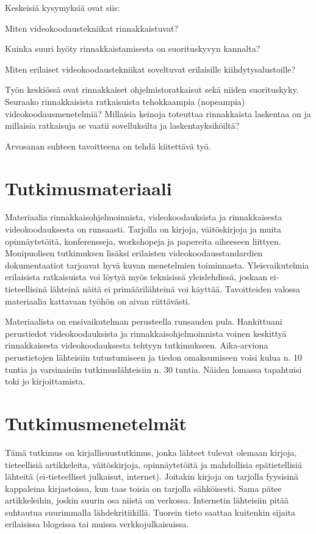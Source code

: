 \documentclass[12pt,a4paper,finnish,oneside]{article}
\begin{document}
Keskeisiä kysymyksiä ovat siis:
\begin{compactitem}
\item Miten videokoodaustekniikat rinnakkaistuvat?
\item Kuinka suuri hyöty rinnakkaistamisesta on suorituskyvyn kannalta?
\item Miten erilaiset videokoodaustekniikat soveltuvat erilaisille 
kiihdytysalustoille?
\end{compactitem}

Työn keskiössä ovat rinnakkaiset ohjelmistoratkaisut sekä niiden suorituskyky. Seuraako rinnakkaisista
ratkaisuista tehokkaampia (nopeampia) videokoodausmenetelmiä? Millaisia
keinoja toteuttaa rinnakkaista laskentaa on ja millaisia ratkaisuja se vaatii
sovelluksilta ja laskentayksiköiltä?

Arvosanan suhteen tavoitteena on tehdä kiitettävä työ.

\section{Tutkimusmateriaali}

Materiaalia rinnakkaisohjelmoinnista, videokoodauksista ja rinnakkaisesta
videokoodauksesta on runsaasti. Tarjolla on kirjoja, väitöskirjoja ja muita
opinnäytetöitä, konferensseja, workshopeja ja papereita aiheeseen liittyen.
Monipuolisen tutkimuksen lisäksi erilaisten videokoodausstandardien dokumentaatiot
tarjoavat hyvä kuvan menetelmien toiminnasta. Yleisvaikutelmia erilaisista
ratkaisuista voi löytyä myös teknisissä yleislehdissä, joskaan ei-tieteellisinä
lähteinä näitä ei primäärilähteinä voi käyttää. Tavoitteiden valossa
materiaalia kattavaan työhön on aivan riittävästi.

Materiaalista on ensivaikutelman perusteella runsauden pula.
Hankittuani perustiedot videokoodauksista ja rinnakkaisohjelmoinnista
voinen keskittyä rinnakkaisesta videokoodauksesta tehtyyn tutkimukseen.
Aika-arviona perustietojen lähteisiin tutustumiseen ja tiedon omaksumiseen
voisi kulua n. 10 tuntia ja varsinaisiin tutkimuslähteisiin n. 30 tuntia.
Näiden lomassa tapahtuisi toki jo kirjoittamista.

\section{Tutkimusmenetelmät}

Tämä tutkimus on kirjallisuustutkimus, jonka lähteet tulevat olemaan kirjoja,
tieteellisiä artikkeleita, väitöskirjoja, opinnäytetöitä ja mahdollisia
epätietellisiä lähteitä (ei-tieteelliset julkaisut, internet).
Joitakin kirjoja on tarjolla fyysisinä kappaleina kirjastoissa, kun taas
toisia on tarjolla sähköisesti. Sama pätee artikkeleihin, joskin suurin osa
niistä on verkossa. Internetin lähteisiin pitää suhtautua suurimmalla
lähdekritiikillä. Tuorein tieto saattaa kuitenkin sijaita erilaisissa blogeissa
tai muissa verkkojulkaisuissa.
\end{document}
